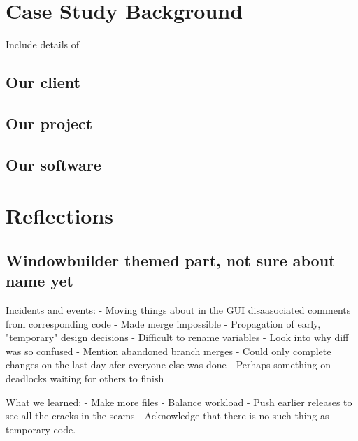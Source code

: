 \documentclass{l3proj}
\begin{document}
\section{Case Study Background}

Include details of 

\subsection{Our client}
\subsection{Our project}
\subsection{Our software}

\section{Reflections}
\subsection{Windowbuilder themed part, not sure about name yet}

Incidents and events:
- Moving things about in the GUI disaasociated comments from corresponding code
- Made merge impossible
- Propagation of early, "temporary" design decisions
- Difficult to rename variables
- Look into why diff was so confused
- Mention abandoned branch merges
- Could only complete changes on the last day afer everyone else was done
- Perhaps something on deadlocks waiting for others to finish

What we learned:
- Make more files
- Balance workload
- Push earlier releases to see all the cracks in the seams
- Acknowledge that there is no such thing as temporary code.
\end{document}
